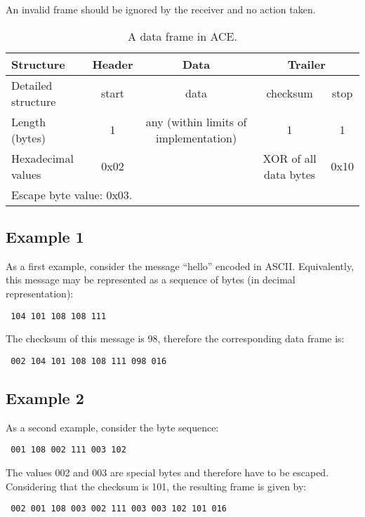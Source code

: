 \documentclass[10pt,a4paper]{article}
\begin{document}
An invalid frame should be ignored by the receiver and no action taken.

\begin{table}[ht]
 \begin{tabular}{|l||c|c|c|c|} \hline
 Structure & Header & Data & \multicolumn{2}{|c|}{Trailer} \\ \hline \hline
 Detailed structure & start & data & checksum & stop \\ \hline
 Length (bytes) & 1 & any (within limits of implementation) & 1 & 1 \\ \hline
 Hexadecimal values & 0x02 & & XOR  of all data bytes & 0x10 \\ \hline
 \multicolumn{5}{l}{Escape byte value: 0x03.} \\
 \end{tabular}
 
 \caption{A data frame in ACE.}
 \label{tab:frame}
\end{table}


\subsection{Example 1}
As a first example, consider the message ``hello'' encoded in ASCII. Equivalently, this message may be represented as a sequence of bytes (in decimal representation): \begin{verbatim} 104 101 108 108 111 \end{verbatim}
The checksum of this message is 98, therefore the corresponding data frame is:
\begin{verbatim} 002 104 101 108 108 111 098 016 \end{verbatim}

\subsection{Example 2}
As a second example, consider the byte sequence:
\begin{verbatim} 001 108 002 111 003 102 \end{verbatim}
The values 002 and 003 are special bytes and therefore have to be escaped. Considering that the checksum is 101, the resulting frame is given by:
\begin{verbatim} 002 001 108 003 002 111 003 003 102 101 016 \end{verbatim}
\end{document}
